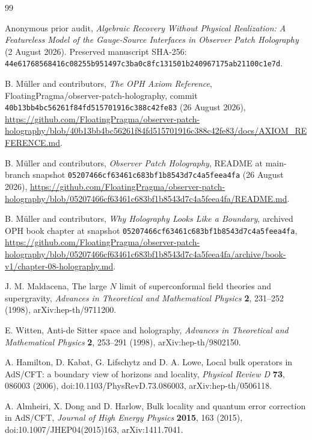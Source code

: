 \documentclass[10pt,a4paper]{article}
\theoremstyle{definition}
\theoremstyle{remark}
\begin{document}
\clearpage
\begin{thebibliography}{99}

Anonymous prior audit, \emph{Algebraic Recovery Without Physical Realization: A
Featureless Model of the Gauge-Source Interfaces in Observer Patch
Holography} (2 August 2026).  Preserved manuscript SHA-256:
\texttt{44e61768568416c08255b951497c3ba0c8fc131501b240967175ab21100c1e7d}.

B. M\"uller and contributors, \emph{The OPH Axiom Reference},
FloatingPragma/observer-patch-holography, commit
\texttt{40b13bb4bc56261f84fd515701916c388c42fe83} (26 August 2026),
\url{https://github.com/FloatingPragma/observer-patch-holography/blob/40b13bb4bc56261f84fd515701916c388c42fe83/docs/AXIOM_REFERENCE.md}.

B. M\"uller and contributors, \emph{Observer Patch Holography}, README at
main-branch snapshot \texttt{05207466cf63461c683bf1b8543d7c4a5feea4fa}
(26 August 2026),
\url{https://github.com/FloatingPragma/observer-patch-holography/blob/05207466cf63461c683bf1b8543d7c4a5feea4fa/README.md}.

B. M\"uller and contributors, \emph{Why Holography Looks Like a Boundary},
archived OPH book chapter at snapshot
\texttt{05207466cf63461c683bf1b8543d7c4a5feea4fa},
\url{https://github.com/FloatingPragma/observer-patch-holography/blob/05207466cf63461c683bf1b8543d7c4a5feea4fa/archive/book-v1/chapter-08-holography.md}.

J. M. Maldacena, The large \(N\) limit of superconformal field theories and
supergravity, \emph{Advances in Theoretical and Mathematical Physics}
\textbf{2}, 231--252 (1998), arXiv:hep-th/9711200.

E. Witten, Anti-de Sitter space and holography,
\emph{Advances in Theoretical and Mathematical Physics} \textbf{2}, 253--291
(1998), arXiv:hep-th/9802150.

A. Hamilton, D. Kabat, G. Lifschytz and D. A. Lowe,
Local bulk operators in AdS/CFT: a boundary view of horizons and locality,
\emph{Physical Review D} \textbf{73}, 086003 (2006),
doi:10.1103/PhysRevD.73.086003, arXiv:hep-th/0506118.

A. Almheiri, X. Dong and D. Harlow, Bulk locality and quantum error correction
in AdS/CFT, \emph{Journal of High Energy Physics} \textbf{2015}, 163 (2015),
doi:10.1007/JHEP04(2015)163, arXiv:1411.7041.


\end{thebibliography}
\end{document}
